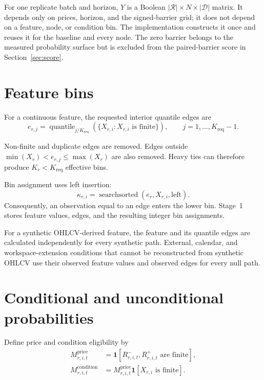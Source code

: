 \documentclass[11pt]{article}
\newcommand{\ind}{\mathbf{1}}
\DeclareMathOperator{\quantile}{quantile}
\DeclareMathOperator{\searchsorted}{searchsorted}
\begin{document}
For one replicate batch and horizon, $Y$ is a Boolean
$|\mathcal R|\times N\times|\mathcal D|$ matrix. It depends only on prices, horizon,
and the signed-barrier grid; it does not depend on a feature, node, or condition bin.
The implementation constructs it once and reuses it for the baseline and every
node. The zero barrier belongs to the measured probability surface but is
excluded from the paired-barrier score in Section~\ref{sec:score}.

\section{Feature bins}

For a continuous feature, the requested interior quantile edges are
\begin{equation}
e_{r,j}
=\quantile_{j/K_{\mathrm{req}}}\!\left(
  \{X_{r,i}:X_{r,i}\text{ is finite}\}\right),
\qquad j=1,\ldots,K_{\mathrm{req}}-1.
\end{equation}

Non-finite and duplicate edges are removed. Edges outside
$\min(X_r)<e_{r,j}\leq\max(X_r)$ are also removed. Heavy ties can therefore
produce $K_r<K_{\mathrm{req}}$ effective bins.

Bin assignment uses left insertion:
\begin{equation}
\kappa_{r,i}=\searchsorted(e_r,X_{r,i},\mathrm{left}).
\end{equation}
Consequently, an observation equal to an edge enters the lower bin. Stage~1
stores feature values, edges, and the resulting integer bin assignments.

For a synthetic OHLCV-derived feature, the feature and its quantile edges are
calculated independently for every synthetic path. External, calendar, and
workspace-extension conditions that cannot be reconstructed from synthetic
OHLCV use their observed feature values and observed edges for every null path.

\section{Conditional and unconditional probabilities}

Define price and condition eligibility by
\begin{align}
M^{\mathrm{price}}_{r,i,t}
  &=\ind\!\left[R^-_{r,i,t},R^+_{r,i,t}\text{ are finite}\right],\\
M^{\mathrm{condition}}_{r,i,t}
  &=M^{\mathrm{price}}_{r,i,t}
    \ind\!\left[X_{r,i}\text{ is finite}\right].
\end{align}
\end{document}
